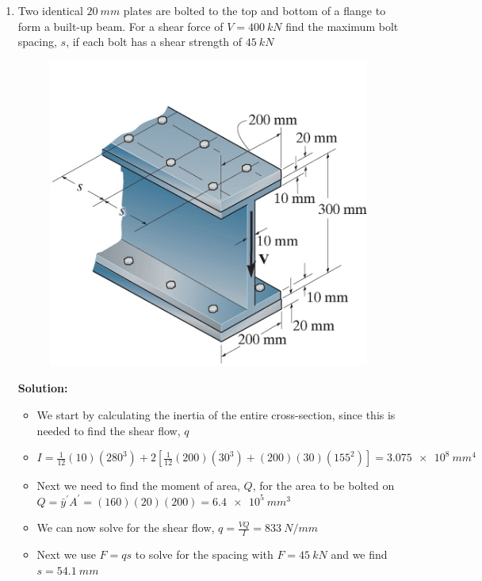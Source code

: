 \documentclass[12pt, oneside]{article}
\begin{document}
\begin{enumerate}
	\item %
		Two identical $ 	\SI{20 }{mm}  $ plates are bolted to the top and bottom of a flange to form a built-up beam.
		For a shear force of $V = 	\SI{400 }{kN} $ find the maximum bolt spacing, $s$, if each bolt has a shear strength of $ 	\SI{45 }{kN}  $
		\begin{figure}[H]
			\centering
			\includegraphics[width=0.6\linewidth]{f7-7}
		\end{figure}
		\textbf{Solution:}
		\begin{itemize}
			\item We start by calculating the inertia of the entire cross-section, since this is needed to find the shear flow, $q$
			\item $I = \frac{1}{12}(10)(280^3) + 2\left[ \frac{1}{12}(200)(30^3) + (200)(30)(155^2) \right] = \SI{3.075e8}{mm^4}$
			\item Next we need to find the moment of area, $Q$, for the area to be bolted on $Q = \bar{y}^\prime A^\prime = (160)(20)(200) = \SI{6.4e5}{mm^3}$
			\item We can now solve for the shear flow, $q = \frac{VQ}{I} = \SI{833}{N/mm}$
			\item Next we use $F = qs$ to solve for the spacing with $F= \SI{45 }{kN}$ and we find $s=\SI{54.1 }{mm}$
		\end{itemize}


\end{enumerate}
\end{document}
